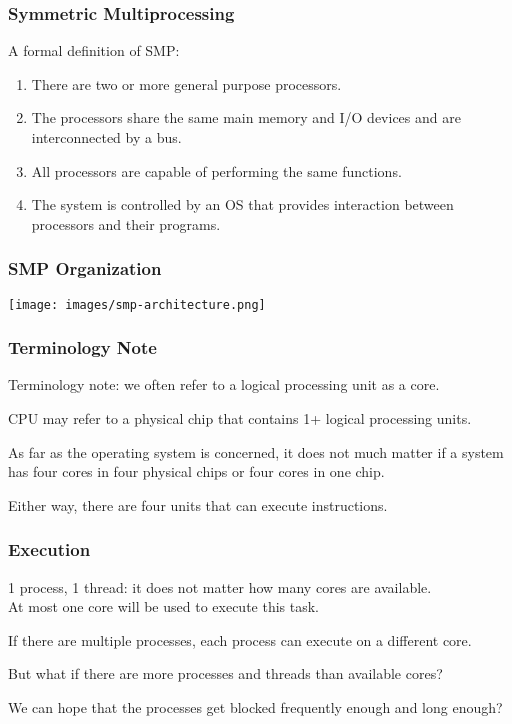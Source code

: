  
\begin{frame}
\frametitle{Symmetric Multiprocessing}


A formal definition of SMP:

\begin{enumerate}
	\item There are two or more general purpose processors.
	\item The processors share the same main memory and I/O devices and are interconnected by a bus.
	\item All processors are capable of performing the same functions.
	\item The system is controlled by an OS that provides interaction between processors and their programs.
\end{enumerate}

\end{frame}

 
\begin{frame}
\frametitle{SMP Organization}

\begin{center}
	\texttt{[image: images/smp-architecture.png]}
\end{center}


\end{frame}

 
\begin{frame}
\frametitle{Terminology Note}


Terminology note: we often refer to a logical processing unit as a \alert{core}. 

CPU may refer to a physical chip that contains 1+ logical processing units. 

As far as the operating system is concerned, it does not much matter if a system has four cores in four physical chips or four cores in one chip.

Either way, there are four units that can execute instructions.



\end{frame}

 
\begin{frame}
\frametitle{Execution}

1 process, 1 thread: it does not matter how many cores are available.\\
\quad At most one core will be used to execute this task. 

If there are multiple processes, each process can execute on a different core. 

But what if there are more processes and threads than available cores?

We can hope that the processes get blocked frequently enough and long enough?



\end{frame}

